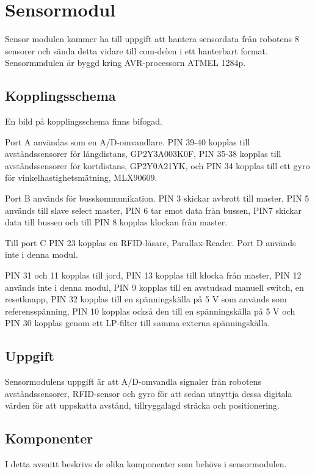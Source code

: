 \documentclass[a4paper,12pt,fleqn]{article}
\begin{document}
\newpage


\section{Sensormodul}
Sensor modulen kommer ha till uppgift att hantera sensordata från robotens 8 sensorer och sända detta vidare till com-delen i ett hanterbart format. Sensormmdulen är byggd kring AVR-processorn ATMEL 1284p.

\subsection{Kopplingsschema}
En bild på kopplingsschema finns bifogad.

Port A användas som en A/D-omvandlare. PIN 39-40 kopplas till avståndssensorer för långdistans, GP2Y3A003K0F, PIN 35-38 kopplas till avståndssensorer för kortdistans, GP2Y0A21YK, och PIN 34 kopplas till ett gyro för vinkelhastighetsmätning, MLX90609.

Port B används för busskommunikation. PIN 3 skickar avbrott till master, PIN 5 används till slave select master, PIN 6 tar emot data från bussen, PIN7 skickar data till bussen och till PIN 8 kopplas klockan från master.

Till port C PIN 23 kopplas en RFID-läsare, Parallax-Reader. Port D används inte i denna modul. 

PIN 31 och 11 kopplas till jord, PIN 13 kopplas till klocka från master, PIN 12 används inte i denna modul, PIN 9 kopplas till en avstudsad manuell switch, en resetknapp, PIN 32 kopplas till en spänningskälla på 5 V som används som referensspänning, PIN 10 kopplas också den till en spänningskälla på 5 V och PIN 30 kopplas genom ett LP-filter till samma externa spänningskälla.

\subsection{Uppgift}
Sensormodulens uppgift är att A/D-omvandla signaler från robotens avståndssensorer, RFID-sensor och gyro för att sedan utnyttja dessa digitala värden för att uppskatta avstånd, tillryggalagd sträcka och positionering.

\subsection{Komponenter}
I detta avsnitt beskrivs de olika komponenter som behövs i sensormodulen.
\end{document}
